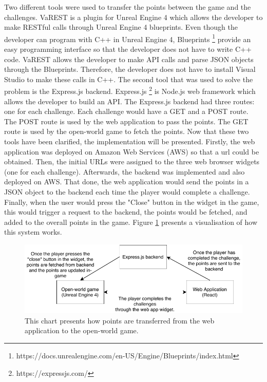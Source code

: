 \documentclass{l4proj}
\begin{document}
Two different tools were used to transfer the points between the game and the challenges.
VaREST is a plugin for Unreal Engine 4 which allows the developer to make RESTful calls through Unreal Engine 4 blueprints.
Even though the developer can program with C++ in Unreal Engine 4, 
Blueprints \footnote{https://docs.unrealengine.com/en-US/Engine/Blueprints/index.html} 
provide an easy programming interface so that the developer does not have to write C++ code.
VaREST allows the developer to make API calls and parse JSON objects through the Blueprints. 
Therefore, the developer does not have to install Visual Studio to make these calls in C++.
The second tool that was used to solve the problem is the Express.js backend.
Express.js \footnote{https://expressjs.com/} is Node.js web framework which allows the developer to build an API.
The Express.js backend had three routes: one for each challenge. Each challenge would have a GET and a POST route.
The POST route is used by the web application to pass the points. 
The GET route is used by the open-world game to fetch the points.
Now that these two tools have been clarified, the implementation will be presented.
Firstly, the web application was deployed on Amazon Web Services (AWS) so that a url could be obtained.
Then, the initial URLs were assigned to the three web browser widgets (one for each challenge).
Afterwards, the backend was implemented and also deployed on AWS.
That done, the web application would send the points in a JSON object to the backend each time the player would complete a challenge.
Finally, when the user would press the "Close" button in the widget in the game, 
this would trigger a request to the backend, the points would be fetched, and added to the overall points in the game.
Figure \ref{fig:pointsImp} presents a visualisation of how this system works.

\begin{figure}[b]
    \centering
    \includegraphics[width=\textwidth, frame]{images/PointsImplementation.pdf}
    \caption{This chart presents how points are transferred from the web application to the open-world game.}
    \label{fig:pointsImp}
\end{figure}
\end{document}
